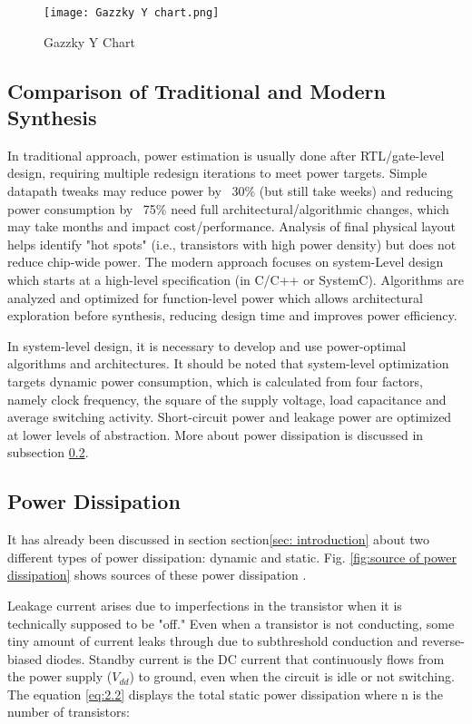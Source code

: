 \documentclass[conference]{IEEEtran}
\begin{document}
\begin{figure}[h!]
    \centering
    \texttt{[image: Gazzky Y chart.png]}
    \caption{Gazzky Y Chart \cite{Ret}}
    \label{fig:gazzky}
\end{figure}

\subsection{Comparison of Traditional and Modern Synthesis}
\label{subsec: comparison of traditional and modern synthesis}
In traditional approach, power estimation is usually done after RTL/gate-level design, requiring multiple redesign iterations to meet power targets. Simple datapath tweaks may reduce power by ~30\% (but still take weeks) and reducing power consumption by ~75\% need full architectural/algorithmic changes, which may take months and impact cost/performance. Analysis of final physical layout helps identify "hot spots" (i.e., transistors with high power density) but does not reduce chip-wide power. The modern approach focuses on system-Level design which starts at a high-level specification (in C/C++ or SystemC). Algorithms are analyzed and optimized for function-level power which allows architectural exploration before synthesis, reducing design time and improves power efficiency.

In system-level design, it is necessary to develop and use power-optimal algorithms and architectures. It should be noted that system-level optimization targets dynamic power consumption, which is calculated from four factors, namely clock frequency, the square of the supply voltage, load capacitance and average switching activity. Short-circuit power and leakage power are optimized at lower levels of abstraction. More about power dissipation is discussed in subsection \ref{subsec: power}.

\subsection{Power Dissipation}
\label{subsec: power}
It has already been discussed in section section\ref{sec: introduction} about two different types of power dissipation: dynamic and static. Fig. \ref{fig:source of power dissipation} shows 
sources of these power dissipation \cite{Saraju01}. 

Leakage current arises due to imperfections in the transistor when it is technically supposed to be "off." Even when a transistor is not conducting, some tiny amount of current leaks through due to subthreshold conduction and reverse-biased diodes. Standby current is the DC current that continuously flows from the power supply ($V_{dd}$) to ground, even when the circuit is idle or not switching. The equation \ref{eq:2.2} displays the total static power dissipation where n is the number of transistors:
\end{document}

